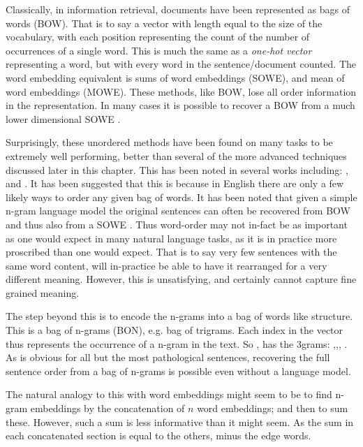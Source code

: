 \documentclass[12pt,parskip]{komatufte}
\begin{document}
Classically, in information retrieval, documents have been represented as bags of words (BOW).
That is to say a vector with length equal to the size of the vocabulary, with each position representing the count of the number of occurrences of a single word.
This is much the same as a \emph{one-hot vector} representing a word, but with every word in the sentence/document counted.
The word embedding equivalent is sums of word embeddings (SOWE), and mean of word embeddings (MOWE).
These methods, like BOW, lose all order information in the representation.
In many cases it is possible to recover a BOW from a much lower dimensional SOWE  .

Surprisingly, these unordered methods have been found on many tasks to be extremely well performing, better than several of the more advanced techniques discussed later in this chapter.
This has been noted in several works including: ,  and .
It has been suggested that this is because in English there are only a few likely ways to order any given bag of words.
It has been noted that given a simple n-gram language model the original sentences can often be recovered from BOW  and thus also from a SOWE .
Thus word-order may not in-fact be as important as one would expect in many natural language tasks, as it is in practice more proscribed than one would expect.
That is to say very few sentences with the same word content, will in-practice be able to have it rearranged for a very different meaning.
However, this is unsatisfying, and certainly cannot capture fine grained meaning.


The step beyond this is to encode the n-grams into a bag of words like structure.
This is a bag of n-grams (BON), e.g. bag of trigrams.
Each index in the vector thus represents the occurrence of a n-gram in the text.
So , has the 3grams: ,,, .
As is obvious for all but the most pathological sentences, recovering the full sentence order from a bag of n-grams is possible even without a language model.

The natural analogy to this with word embeddings might seem to be to find n-gram embeddings by the concatenation of $n$ word embeddings; and then to sum these.
However, such a sum is less informative than it might seem.
As the sum in each concatenated section is equal to the others, minus the edge words.
\end{document}
